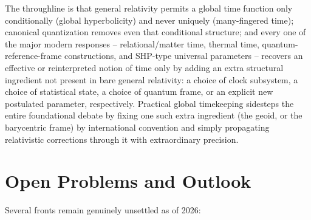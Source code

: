 \documentclass[11pt]{article}
\begin{document}
The throughline is that general relativity permits a global time function only conditionally (global hyperbolicity) and never uniquely (many-fingered time); canonical quantization removes even that conditional structure; and every one of the major modern responses -- relational/matter time, thermal time, quantum-reference-frame constructions, and SHP-type universal parameters -- recovers an effective or reinterpreted notion of time only by adding an extra structural ingredient not present in bare general relativity: a choice of clock subsystem, a choice of statistical state, a choice of quantum frame, or an explicit new postulated parameter, respectively. Practical global timekeeping sidesteps the entire foundational debate by fixing one such extra ingredient (the geoid, or the barycentric frame) by international convention and simply propagating relativistic corrections through it with extraordinary precision.

\section{Open Problems and Outlook}
\label{sec:outlook}

Several fronts remain genuinely unsettled as of 2026:
\end{document}
